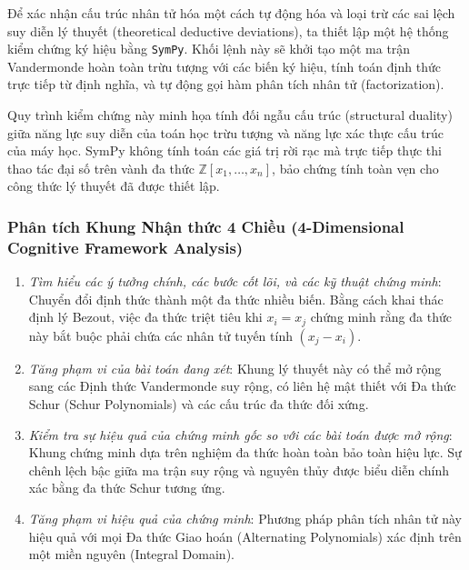 \documentclass{article}
\begin{document}
Để xác nhận cấu trúc nhân tử hóa một cách tự động hóa và loại trừ các sai lệch suy diễn lý thuyết (theoretical deductive deviations), ta thiết lập một hệ thống kiểm chứng ký hiệu bằng \texttt{\textsf{SymPy}}. Khối lệnh này sẽ khởi tạo một ma trận Vandermonde hoàn toàn trừu tượng với các biến ký hiệu, tính toán định thức trực tiếp từ định nghĩa, và tự động gọi hàm phân tích nhân tử (factorization).

Quy trình kiểm chứng này minh họa tính đối ngẫu cấu trúc (structural duality) giữa năng lực suy diễn của toán học trừu tượng và năng lực xác thực cấu trúc của máy học. \textsf{SymPy} không tính toán các giá trị rời rạc mà trực tiếp thực thi thao tác đại số trên vành đa thức $\mathbb{Z}[x_1, \dots, x_n]$, bảo chứng tính toàn vẹn cho công thức lý thuyết đã được thiết lập.





\subsubsection*{Phân tích Khung Nhận thức 4 Chiều (4-Dimensional Cognitive Framework Analysis)}
\begin{enumerate}
 \item \textit{Tìm hiểu các ý tưởng chính, các bước cốt lõi, và các kỹ thuật chứng minh}: Chuyển đổi định thức thành một đa thức nhiều biến. Bằng cách khai thác định lý Bezout, việc đa thức triệt tiêu khi $x_i = x_j$ chứng minh rằng đa thức này bắt buộc phải chứa các nhân tử tuyến tính $(x_j - x_i)$.
 \item \textit{Tăng phạm vi của bài toán đang xét}: Khung lý thuyết này có thể mở rộng sang các Định thức Vandermonde suy rộng, có liên hệ mật thiết với Đa thức Schur (Schur Polynomials) và các cấu trúc đa thức đối xứng.
 \item \textit{Kiểm tra sự hiệu quả của chứng minh gốc so với các bài toán được mở rộng}: Khung chứng minh dựa trên nghiệm đa thức hoàn toàn bảo toàn hiệu lực. Sự chênh lệch bậc giữa ma trận suy rộng và nguyên thủy được biểu diễn chính xác bằng đa thức Schur tương ứng.
 \item \textit{Tăng phạm vi hiệu quả của chứng minh}: Phương pháp phân tích nhân tử này hiệu quả với mọi Đa thức Giao hoán (Alternating Polynomials) xác định trên một miền nguyên (Integral Domain).
\end{enumerate}
\end{document}
